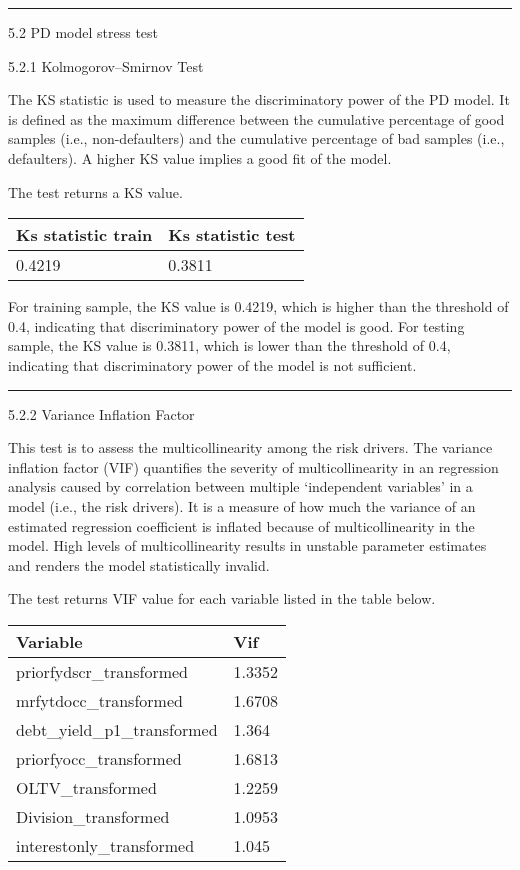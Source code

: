 \begin{center}\rule{0.5\linewidth}{\linethickness}\end{center}

5.2 PD model stress test

5.2.1 Kolmogorov--Smirnov Test

The KS statistic is used to measure the discriminatory power of the PD
model. It is defined as the maximum difference between the cumulative
percentage of good samples (i.e., non-defaulters) and the cumulative
percentage of bad samples (i.e., defaulters). A higher KS value implies
a good fit of the model.

The test returns a KS value.

\begin{longtable}[]{@{}ll@{}}
\toprule
Ks statistic train & Ks statistic test\tabularnewline
\midrule
\endhead
0.4219 & 0.3811\tabularnewline
\bottomrule
\end{longtable}

For training sample, the KS value is 0.4219, which is higher than the
threshold of 0.4, indicating that discriminatory power of the model is
good. For testing sample, the KS value is 0.3811, which is lower than
the threshold of 0.4, indicating that discriminatory power of the model
is not sufficient.

\begin{center}\rule{0.5\linewidth}{\linethickness}\end{center}

5.2.2 Variance Inflation Factor

This test is to assess the multicollinearity among the risk drivers. The
variance inflation factor (VIF) quantifies the severity of
multicollinearity in an regression analysis caused by correlation
between multiple `independent variables' in a model (i.e., the risk
drivers). It is a measure of how much the variance of an estimated
regression coefficient is inflated because of multicollinearity in the
model. High levels of multicollinearity results in unstable parameter
estimates and renders the model statistically invalid.

The test returns VIF value for each variable listed in the table below.

\begin{longtable}[]{@{}ll@{}}
\toprule
Variable & Vif\tabularnewline
\midrule
\endhead
priorfydscr\_transformed & 1.3352\tabularnewline
mrfytdocc\_transformed & 1.6708\tabularnewline
debt\_yield\_p1\_transformed & 1.364\tabularnewline
priorfyocc\_transformed & 1.6813\tabularnewline
OLTV\_transformed & 1.2259\tabularnewline
Division\_transformed & 1.0953\tabularnewline
interestonly\_transformed & 1.045\tabularnewline
\bottomrule
\end{longtable}

